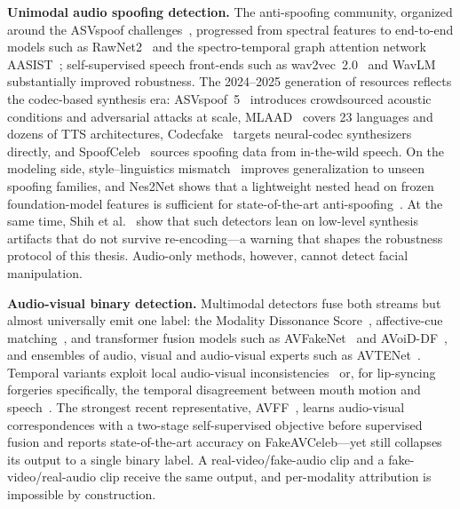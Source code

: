 \textbf{Unimodal audio spoofing detection.} The anti-spoofing community,
organized around the ASVspoof challenges~\cite{wang2020asvspoof}, progressed
from spectral features to end-to-end models such as
RawNet2~\cite{tak2021rawnet2} and the spectro-temporal graph attention network
AASIST~\cite{jung2022aasist}; self-supervised speech front-ends such as
wav2vec~2.0~\cite{tak2022ssl} and WavLM~\cite{chen2022wavlm} substantially
improved robustness. The 2024--2025 generation of resources reflects the
codec-based synthesis era: ASVspoof~5~\cite{wang2024asvspoof5} introduces
crowdsourced acoustic conditions and adversarial attacks at scale,
MLAAD~\cite{muller2024mlaad} covers 23 languages and dozens of TTS
architectures, Codecfake~\cite{xie2024codecfake} targets neural-codec
synthesizers directly, and SpoofCeleb~\cite{jung2025spoofceleb} sources
spoofing data from in-the-wild speech. On the modeling side,
style--linguistics mismatch~\cite{zhu2024slim} improves generalization to
unseen spoofing families, and Nes2Net shows that a lightweight nested head on
frozen foundation-model features is sufficient for state-of-the-art
anti-spoofing~\cite{liu2025nes2net}. At the same time, Shih et
al.~\cite{shih2024artifacts} show that such detectors lean on low-level
synthesis artifacts that do not survive re-encoding---a warning that shapes the
robustness protocol of this thesis. Audio-only methods, however, cannot detect
facial manipulation.

\textbf{Audio-visual binary detection.} Multimodal detectors fuse both streams
but almost universally emit one label: the Modality Dissonance
Score~\cite{chugh2020mds}, affective-cue matching~\cite{mittal2020emotions},
and transformer fusion models such as AVFakeNet~\cite{ilyas2023avfakenet} and
AVoiD-DF~\cite{yang2023avoiddf}, and ensembles of audio, visual and
audio-visual experts such as AVTENet~\cite{hashmi2025avtenet}. Temporal
variants exploit local audio-visual inconsistencies~\cite{astrid2025localtemporal}
or, for lip-syncing forgeries specifically, the temporal disagreement between
mouth motion and speech~\cite{liu2024lipslying}. The strongest recent representative,
AVFF~\cite{oorloff2024avff}, learns audio-visual correspondences with a
two-stage self-supervised objective before supervised fusion and reports
state-of-the-art accuracy on FakeAVCeleb---yet still collapses its output to
a single binary label. A real-video/fake-audio clip and a
fake-video/real-audio clip receive the same output, and per-modality
attribution is impossible by construction.

